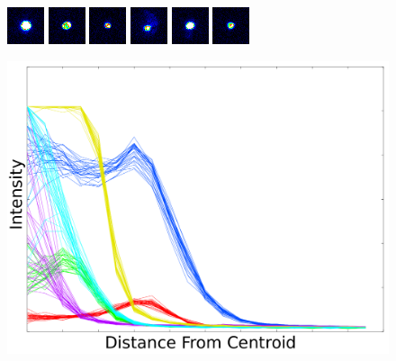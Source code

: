 \documentclass[runningheads,a4paper]{llncs}
\begin{document}
\begin{figure}[t]
\begin{minipage}{0.60\textwidth}
\includegraphics[width=0.15\linewidth]{images/SpotPPMs/tagged_2_frame_599_point_FC_0.png}
\includegraphics[width=0.15\linewidth]{images/SpotPPMs/tagged_5_frame_838_point_FC_0.png}
\includegraphics[width=0.15\linewidth]{images/SpotPPMs/tagged_8_frame_1085_point_FC_0.png}
\includegraphics[width=0.15\linewidth]{images/SpotPPMs/tagged_11_frame_1328_point_FC_0.png}
\includegraphics[width=0.15\linewidth]{images/SpotPPMs/tagged_14_frame_1594_point_FC_0.png}
\includegraphics[width=0.15\linewidth]{images/SpotPPMs/tagged_17_frame_1819_point_FC_0.png}
\end{minipage}
\begin{minipage}{0.39\textwidth}
 \includegraphics[width=0.99\linewidth]{images/AllLaserPersonalities_OneSpot.png}
\end{minipage}


\end{figure}
\end{document}
